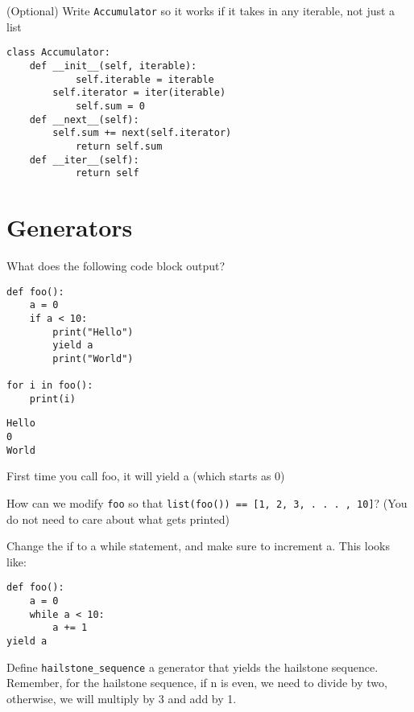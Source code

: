 \documentclass{exam}
\begin{document}
\begin{questions}
\begin{blocksection}
\question (Optional) Write \texttt{Accumulator} so it works if it takes in any iterable, not just a list

\begin{solution}[1.5in]
\begin{lstlisting}
class Accumulator:
	def __init__(self, iterable):
    		self.iterable = iterable
		self.iterator = iter(iterable)
            self.sum = 0
	def __next__(self):
    	self.sum += next(self.iterator)
    		return self.sum
	def __iter__(self):
    		return self
\end{lstlisting}
\end{solution}
\end{blocksection}


\section{Generators}

\begin{blocksection}
\question What does the following code block output?
\begin{lstlisting}
def foo():
	a = 0
	if a < 10:
		print("Hello")
		yield a
		print("World")

for i in foo():
	print(i)
\end{lstlisting}

\begin{solution}[0.75in]
\begin{lstlisting}
Hello
0
World
\end{lstlisting}
First time you call foo, it will yield a (which starts as 0)
\end{solution}

\question How can we modify \texttt{foo} so that \texttt{list(foo()) == [1, 2, 3, . . . , 10]}?  (You do not need to care about what gets printed)

\begin{solution}[0.75in]
Change the if to a while statement, and make sure to increment a. This looks like: 

\begin{lstlisting}
def foo():
	a = 0
	while a < 10:
		a += 1
yield a
\end{lstlisting}
\end{solution}
\end{blocksection}


\begin{blocksection}
\question Define \texttt{hailstone\_sequence} a generator that yields the hailstone sequence. Remember, for the hailstone sequence, if n is even, we need to divide by two, otherwise, we will multiply by 3 and add by 1. 


\end{blocksection}
\end{questions}
\end{document}
